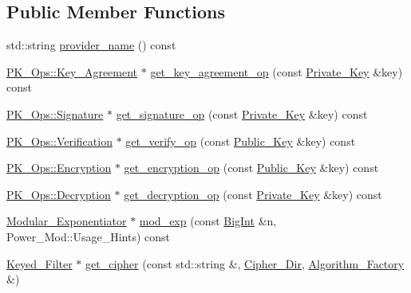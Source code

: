 \subsection*{Public Member Functions}
\begin{DoxyCompactItemize}
\item 
std\-::string \hyperlink{classBotan_1_1Core__Engine_ae1d5fa7f11894d3348e754c072c0b081}{provider\-\_\-name} () const 
\item 
\hyperlink{classBotan_1_1PK__Ops_1_1Key__Agreement}{P\-K\-\_\-\-Ops\-::\-Key\-\_\-\-Agreement} $\ast$ \hyperlink{classBotan_1_1Core__Engine_a8033c4a9b4ea97e54fb7690b0754a708}{get\-\_\-key\-\_\-agreement\-\_\-op} (const \hyperlink{classBotan_1_1Private__Key}{Private\-\_\-\-Key} \&key) const 
\item 
\hyperlink{classBotan_1_1PK__Ops_1_1Signature}{P\-K\-\_\-\-Ops\-::\-Signature} $\ast$ \hyperlink{classBotan_1_1Core__Engine_a36e993c6ea36dd08842b14dac7c76cc3}{get\-\_\-signature\-\_\-op} (const \hyperlink{classBotan_1_1Private__Key}{Private\-\_\-\-Key} \&key) const 
\item 
\hyperlink{classBotan_1_1PK__Ops_1_1Verification}{P\-K\-\_\-\-Ops\-::\-Verification} $\ast$ \hyperlink{classBotan_1_1Core__Engine_aaa07d5cb25119f3918d977dac5c16574}{get\-\_\-verify\-\_\-op} (const \hyperlink{classBotan_1_1Public__Key}{Public\-\_\-\-Key} \&key) const 
\item 
\hyperlink{classBotan_1_1PK__Ops_1_1Encryption}{P\-K\-\_\-\-Ops\-::\-Encryption} $\ast$ \hyperlink{classBotan_1_1Core__Engine_a19ff03029663e18e43f0240a55af8a2b}{get\-\_\-encryption\-\_\-op} (const \hyperlink{classBotan_1_1Public__Key}{Public\-\_\-\-Key} \&key) const 
\item 
\hyperlink{classBotan_1_1PK__Ops_1_1Decryption}{P\-K\-\_\-\-Ops\-::\-Decryption} $\ast$ \hyperlink{classBotan_1_1Core__Engine_a54b7a75ec99dea7c71357f374c0a8838}{get\-\_\-decryption\-\_\-op} (const \hyperlink{classBotan_1_1Private__Key}{Private\-\_\-\-Key} \&key) const 
\item 
\hyperlink{classBotan_1_1Modular__Exponentiator}{Modular\-\_\-\-Exponentiator} $\ast$ \hyperlink{classBotan_1_1Core__Engine_a34f552303a1e87a5617d93877380d2e1}{mod\-\_\-exp} (const \hyperlink{classBotan_1_1BigInt}{Big\-Int} \&n, Power\-\_\-\-Mod\-::\-Usage\-\_\-\-Hints) const 
\item 
\hyperlink{classBotan_1_1Keyed__Filter}{Keyed\-\_\-\-Filter} $\ast$ \hyperlink{classBotan_1_1Core__Engine_ab987b1f9701de5371e86bf10412ba8db}{get\-\_\-cipher} (const std\-::string \&, \hyperlink{namespaceBotan_ad9d14ffdc73fc19966421979b32ee759}{Cipher\-\_\-\-Dir}, \hyperlink{classBotan_1_1Algorithm__Factory}{Algorithm\-\_\-\-Factory} \&)

\end{DoxyCompactItemize}
